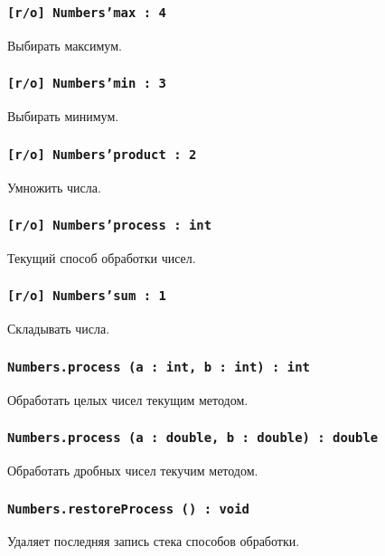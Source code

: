 \subsubsection{\texttt{[r/o] Numbers'max : 4}}

Выбирать максимум.

\subsubsection{\texttt{[r/o] Numbers'min : 3}}

Выбирать минимум.

\subsubsection{\texttt{[r/o] Numbers'product : 2}}

Умножить числа.

\subsubsection{\texttt{[r/o] Numbers'process : int}}

Текущий способ обработки чисел.

\subsubsection{\texttt{[r/o] Numbers'sum : 1}}

Складывать числа.

\subsubsection{\texttt{Numbers.process (a : int, b : int) : int}}

Обработать целых чисел текущим методом.

\subsubsection{\texttt{Numbers.process (a : double, b : double) : double}}

Обработать дробных чисел текучим методом.

\subsubsection{\texttt{Numbers.restoreProcess () : void}}

Удаляет последняя запись стека способов обработки.

